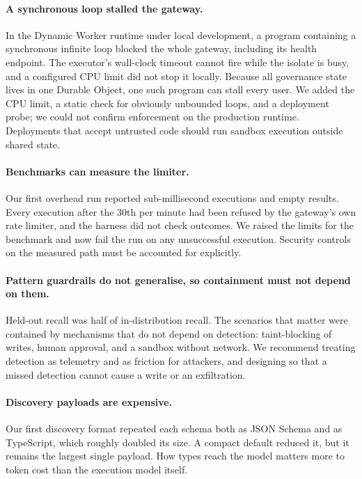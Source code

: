 \documentclass[11pt]{article}
\begin{document}
\paragraph{A synchronous loop stalled the gateway.} In the Dynamic Worker runtime under local development, a program containing a synchronous infinite loop blocked the whole gateway, including its health endpoint. The executor's wall-clock timeout cannot fire while the isolate is busy, and a configured CPU limit did not stop it locally. Because all governance state lives in one Durable Object, one such program can stall every user. We added the CPU limit, a static check for obviously unbounded loops, and a deployment probe; we could not confirm enforcement on the production runtime. Deployments that accept untrusted code should run sandbox execution outside shared state.
\paragraph{Benchmarks can measure the limiter.} Our first overhead run reported sub-millisecond executions and empty results. Every execution after the 30th per minute had been refused by the gateway's own rate limiter, and the harness did not check outcomes. We raised the limits for the benchmark and now fail the run on any unsuccessful execution. Security controls on the measured path must be accounted for explicitly.
\paragraph{Pattern guardrails do not generalise, so containment must not depend on them.} Held-out recall was half of in-distribution recall. The scenarios that matter were contained by mechanisms that do not depend on detection: taint-blocking of writes, human approval, and a sandbox without network. We recommend treating detection as telemetry and as friction for attackers, and designing so that a missed detection cannot cause a write or an exfiltration.
\paragraph{Discovery payloads are expensive.} Our first discovery format repeated each schema both as JSON Schema and as TypeScript, which roughly doubled its size. A compact default reduced it, but it remains the largest single payload. How types reach the model matters more to token cost than the execution model itself.
\end{document}

